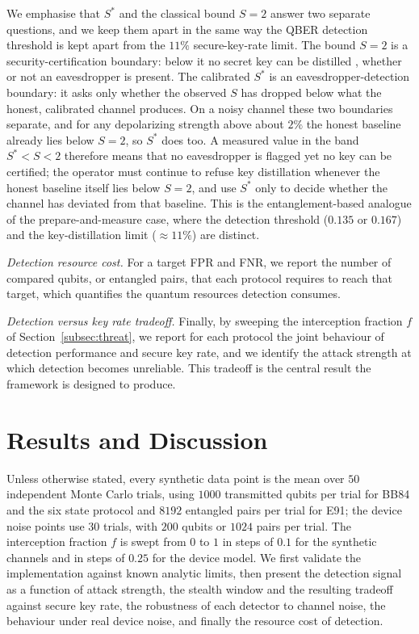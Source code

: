 \documentclass[conference]{IEEEtran}
\begin{document}
We emphasise that $S^*$ and the classical bound $S=2$ answer two separate
questions, and we keep them apart in the same way the QBER detection threshold is
kept apart from the $11\%$ secure-key-rate limit. The bound $S=2$ is a
security-certification boundary: below it no secret key can be distilled
\cite{singh2021role}, whether or not an eavesdropper is present. The calibrated
$S^*$ is an eavesdropper-detection boundary: it asks only whether the observed $S$
has dropped below what the honest, calibrated channel produces. On a noisy channel
these two boundaries separate, and for any depolarizing strength above about $2\%$
the honest baseline already lies below $S=2$, so $S^*$ does too. A measured value
in the band $S^*<S<2$ therefore means that no eavesdropper is flagged yet no key
can be certified; the operator must continue to refuse key distillation whenever
the honest baseline itself lies below $S=2$, and use $S^*$ only to decide whether
the channel has deviated from that baseline. This is the entanglement-based
analogue of the prepare-and-measure case, where the detection threshold ($0.135$
or $0.167$) and the key-distillation limit ($\approx 11\%$) are distinct.

\textit{Detection resource cost.} For a target FPR and FNR, we report the number
of compared qubits, or entangled pairs, that each protocol requires to reach
that target, which quantifies the quantum resources detection consumes.

\textit{Detection versus key rate tradeoff.} Finally, by sweeping the
interception fraction $f$ of Section~\ref{subsec:threat}, we report for each
protocol the joint behaviour of detection performance and secure key rate, and
we identify the attack strength at which detection becomes unreliable. This
tradeoff is the central result the framework is designed to produce.

\section{Results and Discussion}
\label{sec:results}
Unless otherwise stated, every synthetic data point is the mean over $50$
independent Monte Carlo trials, using $1000$ transmitted qubits per trial for
BB84 and the six state protocol and $8192$ entangled pairs per trial for E91; the
device noise points use $30$ trials, with $200$ qubits or $1024$ pairs per trial.
The interception fraction $f$ is swept from $0$ to $1$ in steps of $0.1$ for the
synthetic channels and in steps of $0.25$ for the device model. We first validate
the implementation against known analytic limits, then present the detection
signal as a function of attack strength, the stealth window and the resulting
tradeoff against secure key rate, the robustness of each detector to channel
noise, the behaviour under real device noise, and finally the resource cost of
detection.
\end{document}
